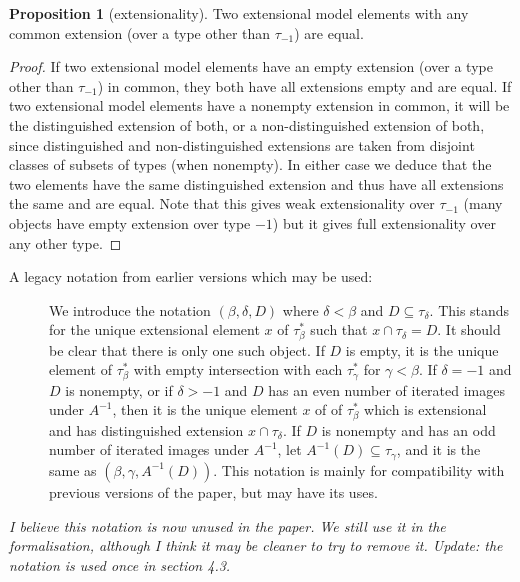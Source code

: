 \documentclass[112pt]{article}
\theoremstyle{definition}
\newtheorem{proposition}[theorem]{Proposition}
\theoremstyle{remark}
\newenvironment{annot}{\begin{center}\color{blue}\sl}{\end{center}}
\begin{document}
\begin{proposition}[extensionality]\label{prop:extensionality}
Two extensional model elements with any common extension (over a type other than $\tau_{-1}$) are equal.
\end{proposition}
\begin{proof}
If two extensional model elements have an empty extension (over a type other than $\tau_{-1}$) in common, they both have all extensions empty and are equal.  If two extensional model elements have a nonempty extension in common, it will be the distinguished extension of both, or a non-distinguished extension of both, since distinguished and non-distinguished extensions are taken from disjoint classes of subsets of types (when nonempty).
In either case we deduce that the two elements have the same distinguished extension and thus have all extensions the same and are equal.  Note that this gives weak extensionality over $\tau_{-1}$ (many objects have empty extension over type $-1$) but it gives full extensionality over any other type.
\end{proof}

\begin{description}
\item[A legacy notation from earlier versions which may be used:]  We introduce the notation $(\beta,\delta,D)$ where $\delta<\beta$ and  $D \subseteq \tau_\delta$.   This stands for the unique extensional element $x$ of $\tau_\beta^*$ such that $x \cap \tau_\delta = D$.  It should be clear that there is only one such object.  If $D$ is empty, it is the unique
element of $\tau_\beta^*$ with empty intersection with each $\tau_\gamma^*$ for $\gamma<\beta$.  If $\delta=-1$ and $D$ is nonempty, or if $\delta >-1$
and $D$ has an even number of iterated images under $A^{-1}$, then it is the unique element $x$ of of $\tau_\beta^*$ which is extensional and has distinguished extension $x \cap \tau_\delta$.  If $D$ is nonempty and has an odd number of iterated images under $A^{-1}$, let $A^{-1}(D) \subseteq \tau_\gamma$, and it is the same as $(\beta,\gamma,A^{-1}(D))$.  This notation is mainly for compatibility with previous versions of the paper, but may have its uses.
\end{description}
\begin{annot}
  I believe this notation is now unused in the paper.
  We still use it in the formalisation, although I think it may be cleaner to try to remove it.
  Update: the notation is used once in section 4.3.
\end{annot}
\end{document}
